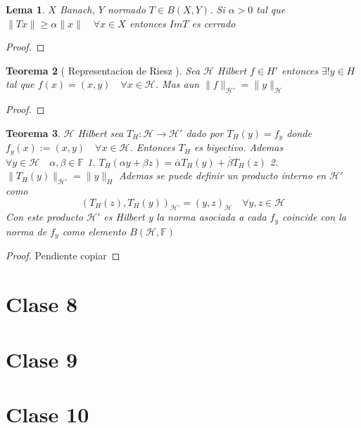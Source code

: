 \documentclass[10pt]{extarticle}
\theoremstyle{break}
\newtheorem{theorem}{Teorema}[section]
\newtheorem{lemma}[theorem]{Lema}
\theoremstyle{definition}
\begin{document}
\begin{lemma}
	$X$ Banach, $Y$ normado $T\in B( X,Y) $. Si $\alpha >0$ tal que $\lVert Tx \rVert \geq \alpha\lVert x \rVert \quad \forall x\in X $ entonces $ImT$ es cerrado 
\end{lemma}
\begin{proof}
	
\end{proof}

\begin{theorem}[ Representacion de Riesz ] \label{7.3}
Sea $\mathcal{H}$ Hilbert $f\in H'$ entonces $\exists !y\in H$ tal que $f(x)=(x,y)\quad\forall x\in \mathcal{H}$. Mas aun $\lVert f \rVert_{\mathcal{H}'}=\lVert y \rVert_{\mathcal{H}}$
\end{theorem}
\begin{proof}
	
\end{proof}

\begin{theorem} \label{7.4}
	$\mathcal{H}$ Hilbert sea $T_{H}:\mathcal{H}\rightarrow\mathcal{H'}$ dado por $T_{H}(y)=f_{y}$ donde $f_{y}(x):=(x,y)\quad\forall x\in \mathcal{H}$. Entonces $T_{H}$ es biyectivo. Ademas $\forall y\in \mathcal{H}\quad\alpha,\beta\in \mathbb{F}$
	1. $T_{H}(\alpha y + \beta z)=\overline{\alpha}T_{H}(y)+\overline{\beta}T_{H}(z)$
	2. $\lVert T_{H}(y) \rVert_{\mathcal{H}'}=\lVert y \rVert_{H}$
	Ademas se puede definir un producto interno en $\mathcal{H}'$ como 
	$$(T_{H}(z),T_{H}(y))_{\mathcal{H}'}=(y,z)_{\mathcal{H}}\quad \forall y,z\in \mathcal{H}$$
	Con este producto $\mathcal{H}'$ es Hilbert y la norma asociada a cada $f_{y}$ coincide con la norma de $f_{y}$ como elemento $B(\mathcal{H},\mathbb{F})$
\end{theorem}

\begin{proof}
	Pendiente copiar

\end{proof}



\section{Clase 8}
\section{Clase 9}

\section{Clase 10}
\end{document}
